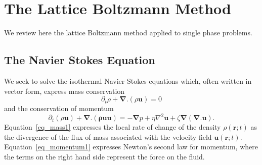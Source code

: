 %
%
%
%
%
%


\section{The Lattice Boltzmann Method}

We review here the lattice Boltzmann method applied to single
phase problems.

\subsection{The Navier Stokes Equation}

We seek to solve the isothermal Navier-Stokes equations which, often
written in vector form, express mass conservation
\begin{equation}
\partial_t \rho + \boldsymbol{\nabla}.(\rho\mathbf{u}) = 0
\label{eq_mass1}
\end{equation}
and the conservation of momentum
\begin{equation}
\partial_t (\rho\mathbf{u}) + \boldsymbol{\nabla}.(\mathbf{\rho uu}) =
-\boldsymbol{\nabla}p + \eta \nabla^2 \mathbf{u}
+\zeta \boldsymbol{\nabla}(\boldsymbol{\nabla}.\mathbf{u}).
\label{eq_momentum1}
\end{equation}
Equation~\ref{eq_mass1} expresses the local rate of change of the
density $\rho(\mathbf{r}; t)$ as the divergence of the flux of
mass associated with the velocity field $\mathbf{u}(\mathbf{r}; t)$.
Equation~\ref{eq_momentum1} expresses Newton's second law for
momentum, where the terms on the right hand side represent the
force on the fluid.

